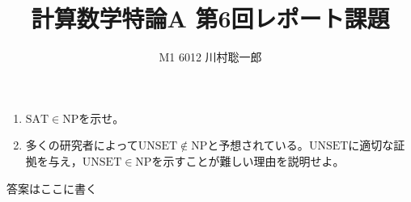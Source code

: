 \documentclass[dvipdfmx]{jsreport}
\title{計算数学特論A 第6回レポート課題}
\author{M1 6012 川村聡一郎}
\date{}
\begin{document}
\maketitle

\begin{tcolorbox}
\begin{enumerate}
	\item $\mathrm{SAT}\in \mathrm{NP}$を示せ。
	\item 多くの研究者によって$\mathrm{UNSET}\not\in \mathrm{NP}$と予想されている。$\mathrm{UNSET}$に適切な証拠を与え，$\mathrm{UNSET}\in \mathrm{NP}$を示すことが難しい理由を説明せよ。
\end{enumerate}
\end{tcolorbox}

\begin{souanswer} %
	答案はここに書く
\end{souanswer}
\end{document}
